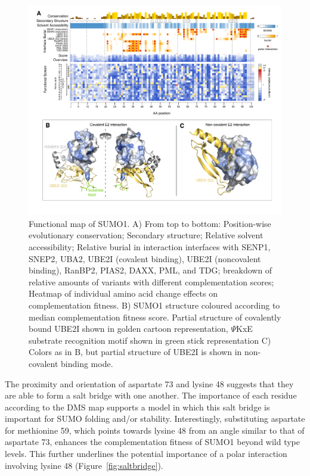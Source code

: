 \begin{figure}[h!]
	\centering
	\includegraphics[width=\textwidth]{img/sumo-map.pdf}
	\caption{Functional map of SUMO1. A) From top to bottom: Position-wise evolutionary conservation; Secondary structure; Relative solvent accessibility; Relative burial in interaction interfaces with SENP1, SNEP2, UBA2, UBE2I (covalent binding), UBE2I (noncovalent binding), RanBP2, PIAS2, DAXX, PML, and TDG; breakdown of relative amounts of variants with different complementation scores; Heatmap of individual amino acid change effects on complementation fitness. B) SUMO1 structure coloured according to median complementation fitness score. Partial structure of covalently bound UBE2I shown in golden cartoon representation, $\Psi$KxE substrate recognition motif shown in green stick representation C) Colors as in B, but partial structure of UBE2I is shown in non-covalent binding mode.}
	\label{fig:sumo-map}
\end{figure}

The proximity and orientation of aspartate 73 and lysine 48 suggests that they are able to form a salt bridge with one another.  The importance of each residue according to the DMS map supports a model in which this salt bridge is important for SUMO folding and/or stability. Interestingly, substituting aspartate for methionine 59, which points towards lysine 48 from an angle similar to that of aspartate 73, enhances the complementation fitness of SUMO1 beyond wild type levels.  This further underlines the potential importance of a polar interaction involving lysine 48 (Figure~\ref{fig:saltbridge}).

